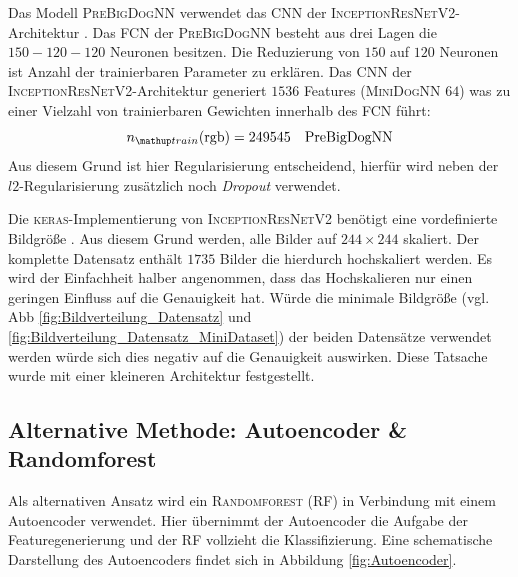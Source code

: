 Das Modell \textsc{PreBigDogNN} verwendet das CNN der
\textsc{InceptionResNetV2}-Architektur \cite{InceptionResNetV2}.
Das FCN der \textsc{PreBigDogNN} besteht aus drei Lagen die $150-120-120$
Neuronen besitzen. Die Reduzierung von
$150$ auf $120$ Neuronen ist Anzahl der trainierbaren Parameter zu erklären.
Das CNN der \textsc{InceptionResNetV2}-Architektur generiert
$1536$ Features (\textsc{MiniDogNN} $64$) was zu einer Vielzahl von
trainierbaren Gewichten innerhalb des FCN führt:
\begin{equation}
  \label{eq:ntrain_PreDogNN_PreBigDogNN}
  n\ua{train}(\mathrm{rgb}) = 249545 \quad \mathrm{PreBigDogNN}
\end{equation}
Aus diesem Grund ist hier Regularisierung entscheidend, hierfür wird neben der
$l2$-Regularisierung zusätzlich noch \emph{Dropout} verwendet.

Die \textsc{keras}-Implementierung von \textsc{InceptionResNetV2} benötigt
eine vordefinierte Bildgröße \cite{InceptionResNetV2}.
Aus diesem Grund werden, alle Bilder auf $244\times 244$ skaliert.
Der komplette Datensatz enthält $1735$ Bilder die hierdurch hochskaliert werden.
Es wird der Einfachheit halber angenommen, dass das Hochskalieren nur einen
geringen Einfluss auf die Genauigkeit hat. Würde die minimale
Bildgröße (vgl. Abb \ref{fig:Bildverteilung_Datensatz} und
 \ref{fig:Bildverteilung_Datensatz_MiniDataset})
der beiden Datensätze verwendet werden
würde sich dies negativ auf die Genauigkeit auswirken. Diese Tatsache
wurde mit einer kleineren Architektur festgestellt.

\subsection{Alternative Methode: Autoencoder \& Randomforest}
Als alternativen Ansatz wird ein \textsc{Randomforest} (RF)
in Verbindung mit einem Autoencoder verwendet. Hier übernimmt der Autoencoder
die Aufgabe der Featuregenerierung und der RF vollzieht die Klassifizierung.
Eine schematische Darstellung des Autoencoders findet sich in Abbildung \ref{fig:Autoencoder}.

